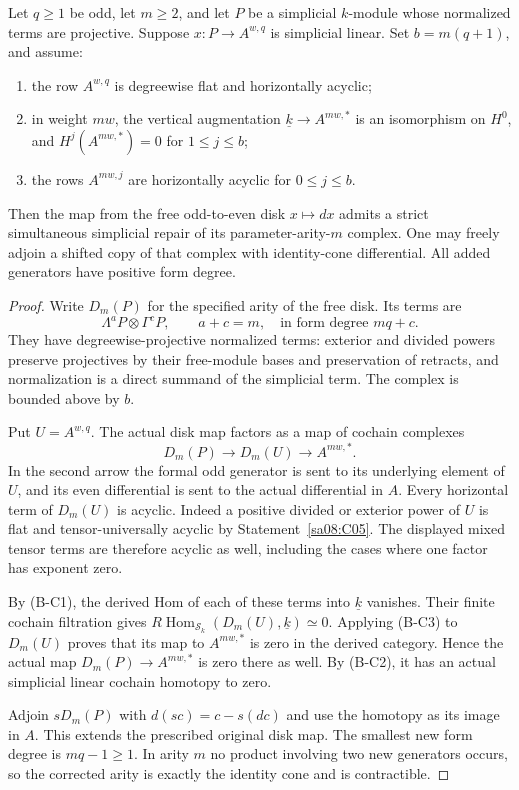 \begin{proposition}
\label{sa08:C23}
Let $q\geq1$ be odd, let $m\geq2$, and
let $P$ be a simplicial $k$-module whose
normalized terms are projective. Suppose
$x:P\to A^{w,q}$ is simplicial linear.
Set $b=m(q+1)$, and assume:
\begin{enumerate}
\item the row $A^{w,q}$ is degreewise
flat and horizontally acyclic;
\item in weight $mw$, the vertical
augmentation $\underline{k}\to A^{mw,*}$
is an isomorphism on $H^0$, and
$H^j(A^{mw,*})=0$ for $1\leq j\leq b$;
\item the rows $A^{mw,j}$ are
horizontally acyclic for $0\leq j\leq b$.
\end{enumerate}
Then the map from the free odd-to-even
disk $x\mapsto dx$ admits a strict
simultaneous simplicial repair of its
parameter-arity-$m$ complex. One may
freely adjoin a shifted copy of that
complex with identity-cone differential.
All added generators have positive
form degree.
\end{proposition}
\begin{proof}
Write $D_m(P)$ for the specified arity
of the free disk. Its terms are
\[
 \Lambda^aP\otimes\Gamma^cP,\qquad a+c=m,
 \quad\text{in form degree }mq+c.
\]
They have degreewise-projective normalized
terms: exterior and divided powers preserve
projectives by their free-module bases and
preservation of retracts, and normalization
is a direct summand of the simplicial term.
The complex is bounded above by $b$.

Put $U=A^{w,q}$. The actual disk map
factors as a map of cochain complexes
\[
 D_m(P)\longrightarrow D_m(U)
       \longrightarrow A^{mw,*}.
\]
In the second arrow the formal odd
generator is sent to its underlying
element of $U$, and its even
differential is sent to the actual
differential in $A$.
Every horizontal term of $D_m(U)$
is acyclic. Indeed a positive divided
or exterior power of $U$ is flat
and tensor-universally acyclic by
Statement~\ref{sa08:C05}. The displayed
mixed tensor terms are therefore
acyclic as well, including the cases
where one factor has exponent zero.

By (B-C1), the derived Hom of each
of these terms into $\underline{k}$
vanishes. Their finite cochain
filtration gives
$R\operatorname{Hom}_{\mathcal S_k}
 (D_m(U),\underline{k})\simeq0$.
Applying (B-C3) to $D_m(U)$ proves
that its map to $A^{mw,*}$ is zero
in the derived category. Hence the
actual map $D_m(P)\to A^{mw,*}$
is zero there as well. By (B-C2),
it has an actual simplicial linear
cochain homotopy to zero.

Adjoin $sD_m(P)$ with
$d(sc)=c-s(dc)$ and use the homotopy
as its image in $A$. This extends
the prescribed original disk map.
The smallest new form degree is
$mq-1\geq1$. In arity $m$ no
product involving two new generators
occurs, so the corrected arity is
exactly the identity cone and is
contractible.
\end{proof}


